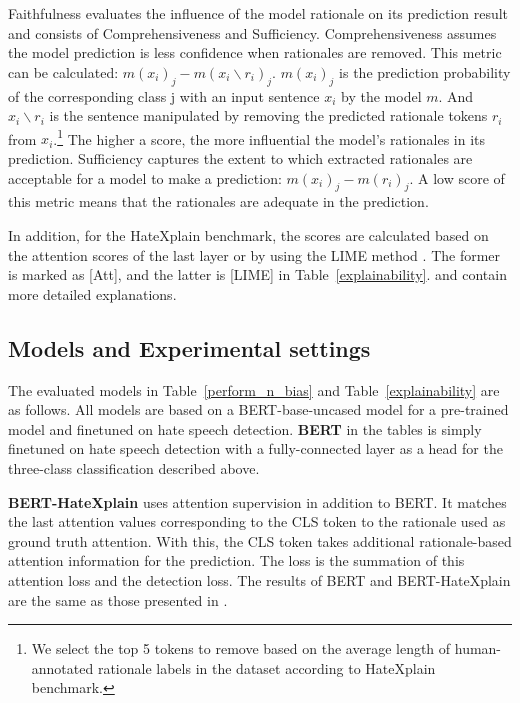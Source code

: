 \documentclass[11pt]{article}
\begin{document}
Faithfulness evaluates the influence of the model rationale on its prediction result and consists of Comprehensiveness and Sufficiency. Comprehensiveness assumes the model prediction is less confidence when rationales are removed. This metric can be calculated: $m(x_{i})_{j} - m(x_{i} \backslash  r_{i})_{j}$. 
$m(x_{i})_{j}$ is the prediction probability of the corresponding class j with an input sentence $x_{i}$ by the model $m$. And $x_{i} \backslash  r_{i}$ is the sentence manipulated by removing the predicted rationale tokens $r_{i}$ from $x_{i}$.\footnote[2]{We select the top 5 tokens to remove based on the average length of human-annotated rationale labels in the dataset according to HateXplain benchmark.} The higher a score, the more influential the model's rationales in its prediction.
Sufficiency captures the extent to which extracted rationales are acceptable for a model to make a prediction: $m(x_{i})_{j} - m(r_{i})_{j}$. A low score of this metric means that the rationales are adequate in the prediction.


In addition, for the HateXplain benchmark, the scores are calculated based on the attention scores of the last layer or by using the LIME method \citep{ribeiro2016should}. The former is marked as [Att], and the latter is [LIME] in Table~\ref{explainability}. \citet{deyoung2019eraser} and \citet{mathew2020hatexplain} contain more detailed explanations. 

\subsection{Models and Experimental settings}

The evaluated models in Table~\ref{perform_n_bias} and Table~\ref{explainability} are as follows. All models are based on a BERT-base-uncased model for a pre-trained model and finetuned on hate speech detection. \textbf{BERT} in the tables is simply finetuned on hate speech detection with a fully-connected layer as a head for the three-class classification described above.

\textbf{BERT-HateXplain} uses attention supervision in addition to BERT. It matches the last attention values corresponding to the CLS token to the rationale used as ground truth attention. With this, the CLS token takes additional rationale-based attention information for the prediction. The loss is the summation of this attention loss and the detection loss. The results of BERT and BERT-HateXplain are the same as those presented in \citet{mathew2020hatexplain}.
\end{document}
